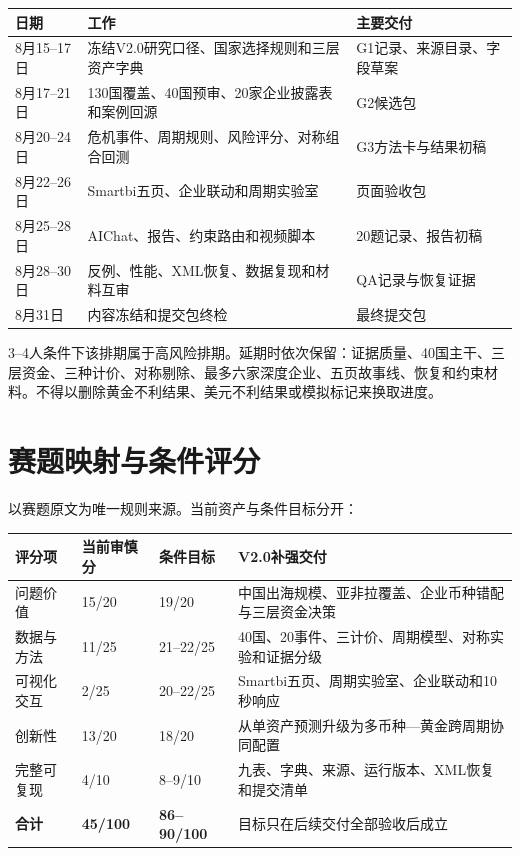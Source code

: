 \documentclass[UTF8,fontset=windows,12pt,openany]{ctexbook}
\begin{document}
\begin{longtable}{p{3.0cm}p{7.5cm}p{3.0cm}}
\toprule
\textbf{日期} & \textbf{工作} & \textbf{主要交付}\\
\midrule
8月15--17日 & 冻结V2.0研究口径、国家选择规则和三层资产字典 & G1记录、来源目录、字段草案\\
8月17--21日 & 130国覆盖、40国预审、20家企业披露表和案例回源 & G2候选包\\
8月20--24日 & 危机事件、周期规则、风险评分、对称组合回测 & G3方法卡与结果初稿\\
8月22--26日 & Smartbi五页、企业联动和周期实验室 & 页面验收包\\
8月25--28日 & AIChat、报告、约束路由和视频脚本 & 20题记录、报告初稿\\
8月28--30日 & 反例、性能、XML恢复、数据复现和材料互审 & QA记录与恢复证据\\
8月31日 & 内容冻结和提交包终检 & 最终提交包\\
\bottomrule
\end{longtable}

3--4人条件下该排期属于高风险排期。延期时依次保留：证据质量、40国主干、三层资金、三种计价、对称剔除、最多六家深度企业、五页故事线、恢复和约束材料。不得以删除黄金不利结果、美元不利结果或模拟标记来换取进度。

\chapter{赛题映射与条件评分}

以赛题原文为唯一规则来源\cite{competition}。当前资产与条件目标分开：

\begin{longtable}{p{3.1cm}p{2.0cm}p{2.0cm}p{6.1cm}}
\toprule
\textbf{评分项} & \textbf{当前审慎分} & \textbf{条件目标} & \textbf{V2.0补强交付}\\
\midrule
问题价值 & 15/20 & 19/20 & 中国出海规模、亚非拉覆盖、企业币种错配与三层资金决策\\
数据与方法 & 11/25 & 21--22/25 & 40国、20事件、三计价、周期模型、对称实验和证据分级\\
可视化交互 & 2/25 & 20--22/25 & Smartbi五页、周期实验室、企业联动和10秒响应\\
创新性 & 13/20 & 18/20 & 从单资产预测升级为多币种—黄金跨周期协同配置\\
完整可复现 & 4/10 & 8--9/10 & 九表、字典、来源、运行版本、XML恢复和提交清单\\
\textbf{合计} & \textbf{45/100} & \textbf{86--90/100} & 目标只在后续交付全部验收后成立\\
\bottomrule
\end{longtable}
\end{document}
